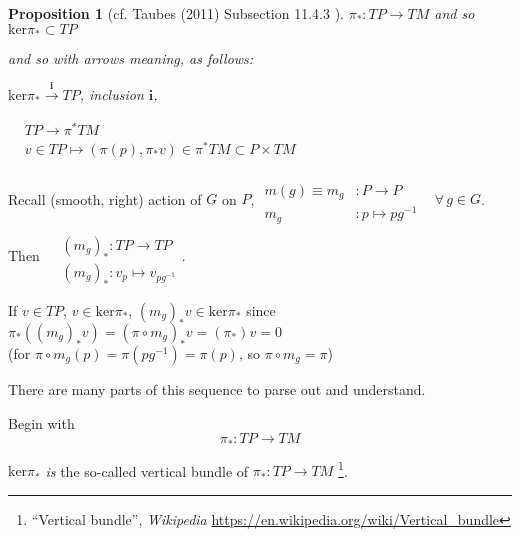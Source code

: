 \documentclass[10pt]{amsart}
\newtheorem{proposition}{Proposition}
\begin{document}
\begin{multicols*}{2}
\begin{proposition}[cf. Taubes (2011) Subsection 11.4.3 \cite{CTaubes2011}]
$\pi_* : TP \to TM$ and so \\
$\text{ker}\pi_* \subset TP$

and so with arrows meaning, as follows:

$\text{ker}{\pi_*} \xrightarrow{ \mathbf{i}} TP$, inclusion $\mathbf{i}$, 

$\begin{aligned} & TP \to \pi^*TM \\
  & v\in TP \mapsto (\pi(p), \pi_*v) \in \pi^*TM \subset P \times TM \end{aligned}$



\end{proposition}

Recall (smooth, right) action of $G$ on $P$, $\begin{aligned} & \quad \\
   m(g) \equiv m_g & : P \to P \\
  m_g & : p\mapsto pg^{-1} \end{aligned}$ \quad \, $\forall \, g \in G$.  Then $\begin{aligned} & \quad \\
  & (m_g)_* : TP \to TP \\
  & (m_g)_*:v_p \mapsto v_{pg^{-1}}\end{aligned}$.  

If $v\in TP$, $v\in \text{ker}\pi_*$, $(m_g)_*v \in \text{ker}\pi_*$ since $\pi_*((m_g)_*v) = (\pi \circ m_g)_*v = (\pi_*)v = 0$ \\
(for $\pi\circ m_g(p) = \pi(pg^{-1}) = \pi(p)$, so $\pi \circ m_g = \pi$)


There are many parts of this sequence to parse out and understand.  

Begin with 
\[
\pi_* : TP \to TM
\]

$\text{ker}{\pi_*}$ \emph{is} the so-called vertical bundle of $\pi_* : TP \to TM$ \footnote{``Vertical bundle'', \emph{Wikipedia} \url{https://en.wikipedia.org/wiki/Vertical_bundle}}.


\end{multicols*}
\end{document}
